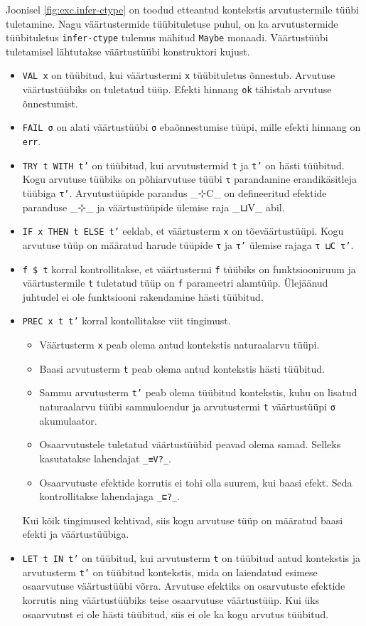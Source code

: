 \documentclass[a4paper,12pt]{article}
\begin{document}
Joonisel \ref{fig:exc.infer-ctype} on toodud etteantud kontekstis arvutustermile tüübi tuletamine.
Nagu väärtustermide tüübituletuse puhul, on ka arvutustermide tüübituletus {\tt infer-ctype} tulemus mähitud {\tt Maybe} monaadi.
Väärtustüübi tuletamisel lähtutakse väärtustüübi konstruktori kujust.
\begin{itemize}
\item {\tt VAL x} on tüübitud, kui väärtustermi {\tt x} tüübituletus õnnestub. Arvutuse väärtustüübiks on tuletatud tüüp. Efekti hinnang {\tt ok} tähistab arvutuse õnnestumist. 
\item {\tt FAIL σ} on alati väärtustüübi {\tt σ} ebaõnnestumise tüüpi, mille efekti hinnang on {\tt err}.
\item {\tt TRY t WITH t'} on tüübitud, kui arvutustermid {\tt t} ja {\tt t'} on hästi tüübitud. Kogu arvutuse tüübiks on põhiarvutuse tüübi {\tt τ} parandamine erandikäsitleja tüübiga {\tt τ'}. Arvutustüüpide parandus _⊹C_ on defineeritud efektide paranduse _⊹_ ja väärtustüüpide ülemise raja _⊔V_ abil.
\item {\tt IF x THEN t ELSE t'} eeldab, et väärtusterm {\tt x} on tõeväärtustüüpi. Kogu arvutuse tüüp on määratud harude tüüpide {\tt τ} ja {\tt τ'} ülemise rajaga {\tt τ ⊔C τ'}.
\item {\tt f \$ t} korral kontrollitakse, et väärtustermi {\tt f} tüübiks on funktsiooniruum ja väärtustermile {\tt t} tuletatud tüüp on {\tt f} parameetri alamtüüp. Ülejäänud juhtudel ei ole funktsiooni rakendamine hästi tüübitud.
\item {\tt PREC x t t'} korral kontollitakse viit tingimust.
  \begin{itemize}
  \item Väärtusterm {\tt x} peab olema antud kontekstis naturaalarvu tüüpi.
  \item Baasi arvutusterm {\tt t} peab olema antud kontekstis hästi tüübitud.
  \item Sammu arvutusterm {\tt t'} peab olema tüübitud kontekstis, kuhu on lisatud naturaalarvu tüübi sammuloendur ja arvutustermi {\tt t} väärtustüüpi {\tt σ} akumulaator.
  \item Osaarvutustele tuletatud väärtustüübid peavad olema samad. Selleks kasutatakse lahendajat {\tt _≡V?_}.
  \item Osaarvutuste efektide korrutis ei tohi olla suurem, kui baasi efekt. Seda kontrollitakse lahendajaga {\tt _⊑?_}.
  \end{itemize}
  Kui kõik tingimused kehtivad, siis kogu arvutuse tüüp on määratud baasi efekti ja väärtustüübiga.
\item {\tt LET t IN t'} on tüübitud, kui arvutusterm {\tt t} on tüübitud antud kontekstis ja arvutusterm {\tt t'} on tüübitud kontekstis, mida on laiendatud esimese osaarvutuse väärtustüübi võrra. Arvutuse efektiks on osarvutuste efektide korrutis ning väärtustüübiks teise osaarvutuse väärtustüüp. Kui üks osaarvutust ei ole hästi tüübitud, siis ei ole ka kogu arvutus tüübitud.
\end{itemize}
\end{document}

